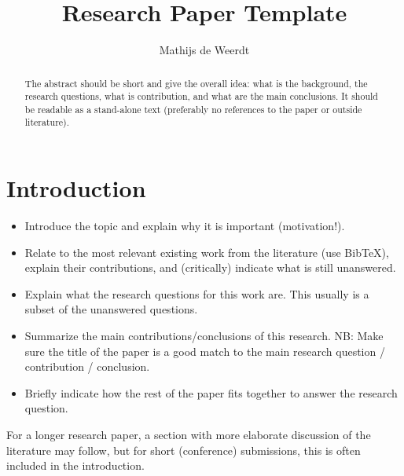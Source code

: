 \documentclass[english]{article}
\begin{document}
\title{Research Paper Template}

\author{Mathijs de Weerdt}
\date{}

\maketitle

\begin{abstract}
The abstract should be short and give the overall idea:
what is the background, the research questions, what is contribution, and what are the main conclusions.
It should be readable as a stand-alone text (preferably no references to the paper or outside literature).
\end{abstract}


\section{Introduction}
\begin{itemize}
\item Introduce the topic and explain why it is important (motivation!). %

\item Relate to the most relevant existing work from the literature (use BibTeX), explain their contributions, and (critically) indicate what is still unanswered. 

\item Explain what the research questions for this work are. 
This usually is a subset of the unanswered questions. %

\item Summarize the main contributions/conclusions of this research.
NB: Make sure the title of the paper is a good match to the main research question / contribution / conclusion.

\item Briefly indicate how the rest of the paper fits together to answer the research question.
\end{itemize}

For a longer research paper, a section with more elaborate discussion of the literature may follow, but for short (conference) submissions, this is often included in the introduction.
\end{document}
